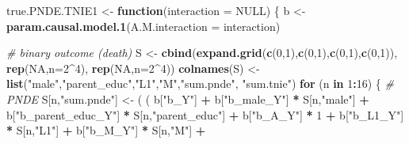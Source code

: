 \documentclass[
]{book}
\newenvironment{Shaded}{\begin{snugshade}}{\end{snugshade}}
\newcommand{\AttributeTok}[1]{\textcolor[rgb]{0.13,0.29,0.53}{#1}}
\newcommand{\CommentTok}[1]{\textcolor[rgb]{0.56,0.35,0.01}{\textit{#1}}}
\newcommand{\ConstantTok}[1]{\textcolor[rgb]{0.56,0.35,0.01}{#1}}
\newcommand{\ControlFlowTok}[1]{\textcolor[rgb]{0.13,0.29,0.53}{\textbf{#1}}}
\newcommand{\DecValTok}[1]{\textcolor[rgb]{0.00,0.00,0.81}{#1}}
\newcommand{\FunctionTok}[1]{\textcolor[rgb]{0.13,0.29,0.53}{\textbf{#1}}}
\newcommand{\NormalTok}[1]{#1}
\newcommand{\OtherTok}[1]{\textcolor[rgb]{0.56,0.35,0.01}{#1}}
\newcommand{\SpecialCharTok}[1]{\textcolor[rgb]{0.81,0.36,0.00}{\textbf{#1}}}
\newcommand{\StringTok}[1]{\textcolor[rgb]{0.31,0.60,0.02}{#1}}
\begin{document}
\begin{Shaded}
\begin{Highlighting}[]
\NormalTok{true.PNDE.TNIE1 }\OtherTok{\textless{}{-}} \ControlFlowTok{function}\NormalTok{(}\AttributeTok{interaction =} \ConstantTok{NULL}\NormalTok{) \{}
\NormalTok{  b }\OtherTok{\textless{}{-}} \FunctionTok{param.causal.model.1}\NormalTok{(}\AttributeTok{A.M.interaction =}\NormalTok{ interaction)}
  
  \CommentTok{\# binary outcome (death)}
\NormalTok{  S }\OtherTok{\textless{}{-}} \FunctionTok{cbind}\NormalTok{(}\FunctionTok{expand.grid}\NormalTok{(}\FunctionTok{c}\NormalTok{(}\DecValTok{0}\NormalTok{,}\DecValTok{1}\NormalTok{),}\FunctionTok{c}\NormalTok{(}\DecValTok{0}\NormalTok{,}\DecValTok{1}\NormalTok{),}\FunctionTok{c}\NormalTok{(}\DecValTok{0}\NormalTok{,}\DecValTok{1}\NormalTok{),}\FunctionTok{c}\NormalTok{(}\DecValTok{0}\NormalTok{,}\DecValTok{1}\NormalTok{)), }\FunctionTok{rep}\NormalTok{(}\ConstantTok{NA}\NormalTok{,}\AttributeTok{n=}\DecValTok{2}\SpecialCharTok{\^{}}\DecValTok{4}\NormalTok{), }\FunctionTok{rep}\NormalTok{(}\ConstantTok{NA}\NormalTok{,}\AttributeTok{n=}\DecValTok{2}\SpecialCharTok{\^{}}\DecValTok{4}\NormalTok{))}
  \FunctionTok{colnames}\NormalTok{(S) }\OtherTok{\textless{}{-}} \FunctionTok{list}\NormalTok{(}\StringTok{"male"}\NormalTok{,}\StringTok{"parent\_educ"}\NormalTok{,}\StringTok{"L1"}\NormalTok{,}\StringTok{"M"}\NormalTok{,}\StringTok{"sum.pnde"}\NormalTok{, }\StringTok{"sum.tnie"}\NormalTok{)}
  \ControlFlowTok{for}\NormalTok{ (n }\ControlFlowTok{in} \DecValTok{1}\SpecialCharTok{:}\DecValTok{16}\NormalTok{) \{}
    \CommentTok{\# PNDE }
\NormalTok{    S[n,}\StringTok{"sum.pnde"}\NormalTok{] }\OtherTok{\textless{}{-}}\NormalTok{ ( ( b[}\StringTok{"b\_Y"}\NormalTok{] }\SpecialCharTok{+} 
\NormalTok{                             b[}\StringTok{"b\_male\_Y"}\NormalTok{] }\SpecialCharTok{*}\NormalTok{ S[n,}\StringTok{"male"}\NormalTok{] }\SpecialCharTok{+} 
\NormalTok{                             b[}\StringTok{"b\_parent\_educ\_Y"}\NormalTok{] }\SpecialCharTok{*}\NormalTok{ S[n,}\StringTok{"parent\_educ"}\NormalTok{] }\SpecialCharTok{+} 
\NormalTok{                             b[}\StringTok{"b\_A\_Y"}\NormalTok{] }\SpecialCharTok{*} \DecValTok{1} \SpecialCharTok{+} 
\NormalTok{                             b[}\StringTok{"b\_L1\_Y"}\NormalTok{] }\SpecialCharTok{*}\NormalTok{ S[n,}\StringTok{"L1"}\NormalTok{] }\SpecialCharTok{+}
\NormalTok{                             b[}\StringTok{"b\_M\_Y"}\NormalTok{] }\SpecialCharTok{*}\NormalTok{ S[n,}\StringTok{"M"}\NormalTok{] }\SpecialCharTok{+}

\end{Highlighting}
\end{Shaded}
\end{document}
